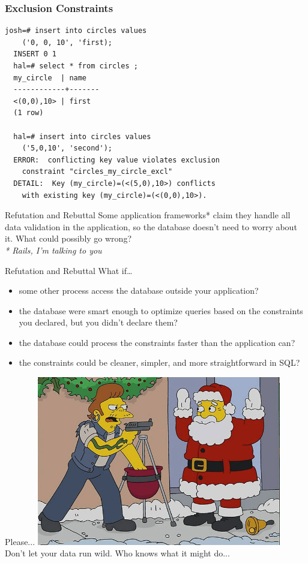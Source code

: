 \documentclass{beamer}
\begin{document}
\begin{frame}[fragile]
    \frametitle{Exclusion Constraints}
    \begin{Verbatim}[fontfamily=courier]
  josh=# insert into circles values
    ('0, 0, 10', 'first);
  INSERT 0 1
  hal=# select * from circles ;
  my_circle  | name
  ------------+-------
  <(0,0),10> | first
  (1 row)
  
  hal=# insert into circles values
    ('5,0,10', 'second');
  ERROR:  conflicting key value violates exclusion
    constraint "circles_my_circle_excl"
  DETAIL:  Key (my_circle)=(<(5,0),10>) conflicts
    with existing key (my_circle)=(<(0,0),10>).
    \end{Verbatim}
\end{frame}

\begin{frame}{Refutation and Rebuttal}
    Some application frameworks{\color{red}*} claim they handle all data validation in the application, so the database doesn't need to worry about it. What could possibly go wrong?
    \\
    \vspace{0.5\textheight}
    {\footnotesize \color{red} \emph{* Rails, I'm talking to you}}
\end{frame}

\begin{frame}{Refutation and Rebuttal}
    What if\ldots
    \begin{itemize}
        \item some other process access the database outside your application?
        \item the database were smart enough to optimize queries based on the constraints you declared, but you didn't declare them?
        \item the database could process the constraints faster than the application can?
        \item the constraints could be cleaner, simpler, and more straightforward in SQL?
    \end{itemize}
\end{frame}

\begin{frame}{Please...}
    \centering
    { 
        \includegraphics[width=0.8\textwidth]{snake.jpg}
        \\
        Don't let your data run wild. Who knows what it might do...
    }
\end{frame}
\end{document}
